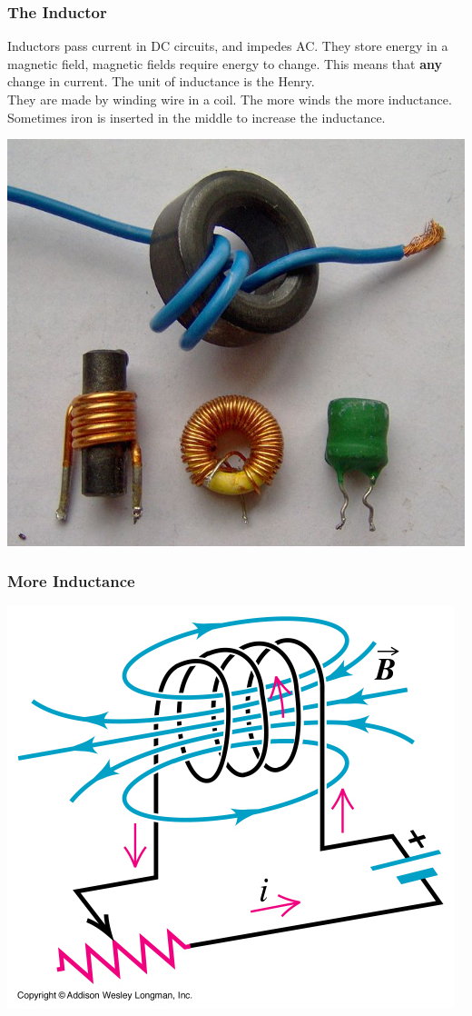 \documentclass[10pt]{beamer}
\begin{document}
\begin{frame}
\frametitle{The Inductor}
Inductors pass current in DC circuits, and impedes AC. They store energy in a magnetic field, magnetic fields require energy to change. This means that \textbf{any} change in current. The unit of inductance is the Henry.\\
They are made by winding wire in a coil. The more winds the more inductance. Sometimes iron is inserted in the middle to increase the inductance.
\begin{center}
\includegraphics[height=.4\textheight]{inductor.jpg}
\end{center}

\end{frame}

\begin{frame}
\frametitle{More Inductance}
\begin{center}
\includegraphics[height=.9\textheight]{inductor.png}
\end{center}
\end{frame}
\end{document}
